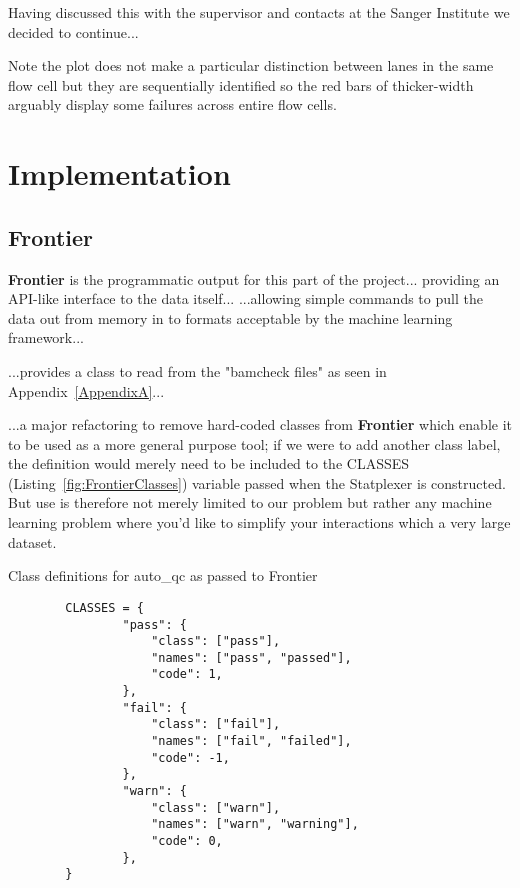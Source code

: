 Having discussed this with the supervisor and contacts at the Sanger Institute
we decided to continue...

Note the plot does not make a particular distinction between lanes in the same
flow cell but they are sequentially identified so the red bars of thicker-width
arguably display some failures across entire flow cells.

\section{Implementation}
\subsection{Frontier}
\textbf{Frontier} is the programmatic output for this part of the project...
providing an API-like interface to the data itself... ...allowing simple
commands to pull the data out from memory in to formats acceptable by the machine
learning framework...

...provides a class to read from the "bamcheck files" as seen in
Appendix~\ref{AppendixA}...

...a major refactoring to remove hard-coded classes from \textbf{Frontier} which
enable it to be used as a more general purpose tool; if we were to add another
class label, the definition would merely need to be included to the CLASSES
(Listing~\ref{fig:FrontierClasses}) variable passed when the Statplexer is
constructed. But use is therefore not merely limited to our problem but rather
any machine learning problem where you'd like to simplify your interactions
which a very large dataset.

\begin{listing}[H]
    \caption[FrontierClasses]{Class definitions for auto\_qc as passed to Frontier}
    \label{fig:FrontierClasses}
    \begin{verbatim}
        CLASSES = {
                "pass": {
                    "class": ["pass"],
                    "names": ["pass", "passed"],
                    "code": 1,
                },
                "fail": {
                    "class": ["fail"],
                    "names": ["fail", "failed"],
                    "code": -1,
                },
                "warn": {
                    "class": ["warn"],
                    "names": ["warn", "warning"],
                    "code": 0,
                },
        }
    \end{verbatim}
\end{listing}



